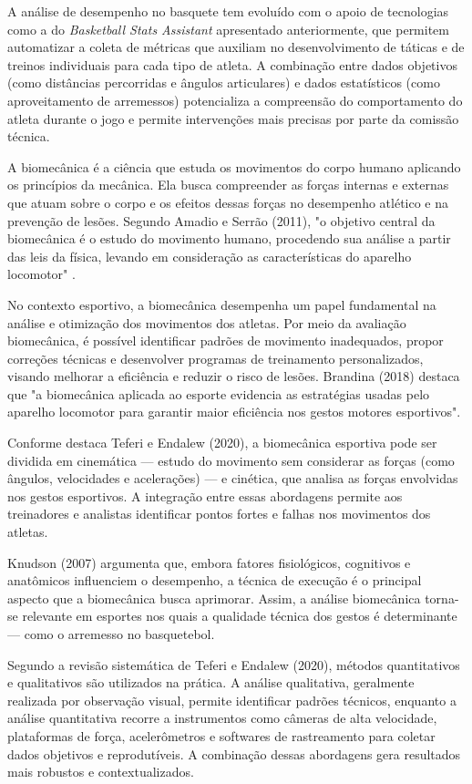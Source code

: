 A análise de desempenho no basquete tem evoluído com o apoio de tecnologias como a do \textit{Basketball Stats Assistant} apresentado anteriormente, 
que permitem automatizar a coleta de métricas que auxiliam no desenvolvimento de táticas e de treinos individuais para cada tipo de atleta. 
A combinação entre dados objetivos (como distâncias percorridas e ângulos articulares) e dados estatísticos (como aproveitamento de arremessos) 
potencializa a compreensão do comportamento do atleta durante o jogo e permite intervenções mais precisas por parte da comissão técnica.


A biomecânica é a ciência que estuda os movimentos do corpo humano aplicando os princípios da mecânica. Ela busca compreender as forças internas e externas que atuam sobre o corpo e os efeitos dessas forças no desempenho atlético e na prevenção de lesões. 
Segundo Amadio e Serrão (2011), "o objetivo central da biomecânica é o estudo do movimento humano, procedendo sua análise a partir das leis da física, levando em consideração as características do aparelho locomotor" .

No contexto esportivo, a biomecânica desempenha um papel fundamental na análise e otimização dos movimentos dos atletas. Por meio da avaliação biomecânica, é possível identificar padrões de movimento inadequados, 
propor correções técnicas e desenvolver programas de treinamento personalizados, visando melhorar a eficiência e reduzir o risco de lesões. 
Brandina (2018) destaca que "a biomecânica aplicada ao esporte evidencia as estratégias usadas pelo aparelho locomotor para garantir maior eficiência nos gestos motores esportivos".

Conforme destaca Teferi e Endalew (2020), a biomecânica esportiva pode ser dividida em cinemática — estudo do movimento sem considerar as forças (como ângulos, velocidades e acelerações) — e cinética, que analisa as forças envolvidas nos gestos esportivos. 
A integração entre essas abordagens permite aos treinadores e analistas identificar pontos fortes e falhas nos movimentos dos atletas.

Knudson (2007) argumenta que, embora fatores fisiológicos, cognitivos e anatômicos influenciem o desempenho, a técnica de execução é o principal aspecto que a biomecânica busca aprimorar. 
Assim, a análise biomecânica torna-se relevante em esportes nos quais a qualidade técnica dos gestos é determinante — como o arremesso no basquetebol.

Segundo a revisão sistemática de Teferi e Endalew (2020), métodos quantitativos e qualitativos são utilizados na prática. A análise qualitativa, geralmente realizada por observação visual, permite identificar padrões técnicos, 
enquanto a análise quantitativa recorre a instrumentos como câmeras de alta velocidade, plataformas de força, acelerômetros e softwares de rastreamento para coletar dados objetivos e reprodutíveis. 
A combinação dessas abordagens gera resultados mais robustos e contextualizados.

